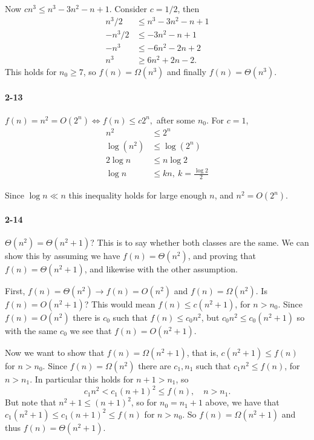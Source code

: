\documentclass{report}
\begin{document}
Now $cn^3 \le n^3 - 3n^2 - n + 1.$ Consider $c = 1/2$, then
\begin{align*}
	n^3/2 &\le n^3 - 3n^2 - n + 1 \\
	-n^3/2 &\le -3n^2 - n + 1 \\
	-n^3 &\le -6n^2 - 2n + 2 \\
	n^3 &\ge 6n^2 + 2n - 2.
\end{align*}
This holds for $n_0 \ge 7$, so $f(n) = \Omega(n^3)$ and finally $f(n) = \Theta(n^3)$.

\paragraph{2-13}$f(n) = n^2 = O\left(2^n\right) \iff f(n) \le c2^n,$ after some $n_0$. For $c = 1$,
\begin{align*}
	n^2 &\le 2^n \\
	\log(n^2) &\le \log(2^n) \\
	2 \log n &\le n\log 2 \\
	\log n &\le kn,\ k = \frac{\log 2}{2}
\end{align*}

Since $\log n \ll n$ this inequality holds for large enough $n$, and $n^2 = O(2^n)$.

\paragraph{2-14} $\Theta(n^2) = \Theta(n^2+1)$? This is to say whether both classes are the same. We can show this by assuming we have $f(n) = \Theta(n^2)$, and proving that $f(n) = \Theta(n^2+1)$, and likewise with the other assumption.

First, $f(n) = \Theta(n^2) \to f(n) = O(n^2)$ and $f(n) = \Omega(n^2)$. Is $f(n) = O(n^2+1)$? This would mean $f(n) \le c\left(n^2+1\right)$, for $n > n_0$. Since $f(n) = O(n^2)$ there is $c_0$ such that $f(n) \le c_0 n^2$, but $c_0 n^2 \le c_0\left(n^2 + 1\right)$ so with the same $c_0$ we see that $f(n) = O(n^2+1)$.

Now we want to show that $f(n) = \Omega(n^2+1)$, that is, $c\left(n^2 + 1\right) \le f(n)$ for $n > n_0$. Since $f(n) = \Omega(n^2)$ there are $c_1, n_1$ such that $c_1 n^2 \le f(n)$, for $n > n_1$. In particular this holds for $n+1 > n_1$, so
\[
	c_1 n^2 < c_1 (n+1)^2 \le f(n), \quad n > n_1.
\]
But note that $n^2 + 1 \le (n+1)^2$, so for $n_0 = n_1 + 1$ above, we have that $c_1\left(n^2 + 1\right) \le c_1 (n+1)^2 \le f(n)$ for $n > n_0$. So $f(n) = \Omega(n^2+1)$ and thus $f(n) = \Theta(n^2 + 1)$.
\end{document}
